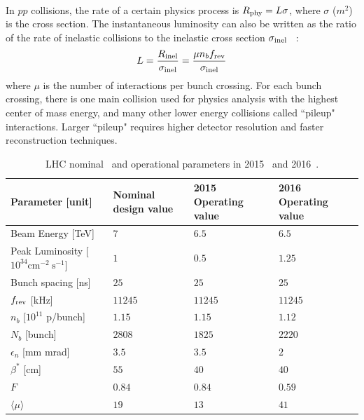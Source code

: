 \paragraph{} 
In $pp$ collisions, the rate of a certain physics process is $R_{\rm phy} = L\sigma$, where $\sigma$ ($m^2$) is the cross section.
The instantaneous luminosity can also be written as the ratio of the rate of inelastic collisions to the inelastic cross section $\sigma_{\rm inel}$ ~\cite{lumi-paper}:
\begin{equation}
\label{Ch2:eq-lumi2}
L = \frac{R_{\rm inel}}{\sigma_{\rm inel}} = \frac{\mu n_b f_{\rm rev}}{\sigma_{\rm inel}}
\end{equation}
where $\mu$ is the number of interactions per bunch crossing. 
For each bunch crossing, there is one main collision used for physics analysis with the highest center of mass energy, and many other lower energy collisions called ``pileup" interactions.
Larger ``pileup" requires higher detector resolution and faster reconstruction techniques.

\begin{table}[]
\centering
\caption[LHC nominal and operational parameters]{LHC nominal~\cite{LHCPaper} and operational parameters in 2015~\cite{LHC_2015} and 2016~\cite{LHC_2016}.}
\begin{tabular*}{\textwidth}{@{\extracolsep{\fill}}llll}
\hline
Parameter [unit]   & Nominal design value & 2015 Operating value  & 2016 Operating value\\
\hline\hline
Beam Energy [TeV]  & $7$  & $6.5$  & $6.5$  \\
Peak Luminosity [$10^{34} \text{cm}^{−2}~\text{s}^{-1}$]   & $1$ &   $0.5$  & $1.25$           \\
Bunch spacing [ns]             &      $25$  &  $25$ &      $25$ \\
$f_{\rm rev}$ [kHz]    &     $11245$  & $11245$  & $11245$ \\
$n_b$  [$10^{11}$ p/bunch]   & $1.15$ &  $1.15$ & $1.12$\\
$N_b$  [bunch]         & $2808$   &      $1825$ &      $2220$\\
$\epsilon_n$  [mm mrad]        & $3.5$ &  $3.5$  & $2$\\
$\beta^*$   [cm]         & $55$  &   $40$  & $40$\\
$F$        &      $0.84$  & $0.84$  &  $0.59$ \\
$\langle \mu \rangle$ & $19$ & $13$ & $41$ \\ \hline
\hline            
\end{tabular*}
\label{Ch2:tab-lhc}
\end{table}

